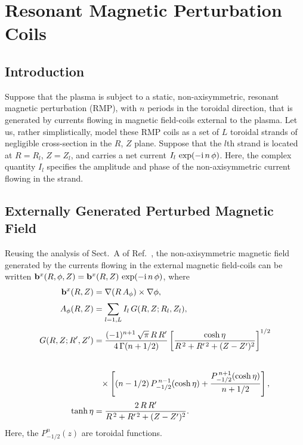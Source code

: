 \documentclass[12pt,prb,aps]{revtex4-1}
\begin{document}
\section{Resonant Magnetic Perturbation Coils}\label{rmp}

\subsection{Introduction}
Suppose that the plasma is subject to a static, non-axisymmetric, resonant magnetic perturbation (RMP),
with $n$ periods in the toroidal direction, that is  generated by currents flowing in magnetic
field-coils external to the plasma. Let us, rather simplistically, model these RMP coils as a set of $L$ toroidal strands of negligible cross-section in the
$R$, $Z$ plane. Suppose that the $l$th strand is located at $R=R_l$, $Z=Z_l$, and carries a net current $I_l\,\exp(-{\rm i}\,n\,\phi)$. Here, the
complex quantity $I_l$ specifies the amplitude and phase of the non-axisymmetric current flowing in the strand. 

\subsection{Externally Generated Perturbed Magnetic Field}
Reusing the analysis of Sect.~A of Ref.~, the non-axisymmetric magnetic field generated by the currents flowing in the external magnetic
field-coils can be written ${\bf b}^x(R,\phi,Z)= {\bf b}^x(R,Z)\,\exp(-{\rm i}\,n\,\phi)$, where
\begin{align}\label{e313}
{\bf b}^x(R,Z)&= \nabla(R\,A_\phi)\times\nabla\phi,\\[0.5ex]
A_\phi(R,Z)&= \sum_{l=1,L} I_l\,G(R,Z;R_l,Z_l),\\[0.5ex]
G(R,Z;R',Z') &= \frac{(-1)^{n+1}\,\sqrt{\pi}\, R\,R'}{4\,\Gamma(n+1/2)}\left[\frac{\cosh\eta}{R^{\,2}+R'^{\,2}+(Z-Z')^2}\right]^{1/2}\nonumber\\[0.5ex]
\nonumber\\[0.5ex]&\phantom{=}\times
\left[(n-1/2)\,P_{-1/2}^{\,n-1}(\cosh\eta) + \frac{P_{-1/2}^{\,n+1}(\cosh\eta)}{n+1/2}\right],\\[0.5ex]
\tanh\eta &= \frac{2\,R\,R'}{R^{\,2} + R'^{\,2}+(Z-Z')^2}.
\end{align}
Here, the $P_{-1/2}^n(z)$ are toroidal functions.\cite{abrama}
\end{document}
